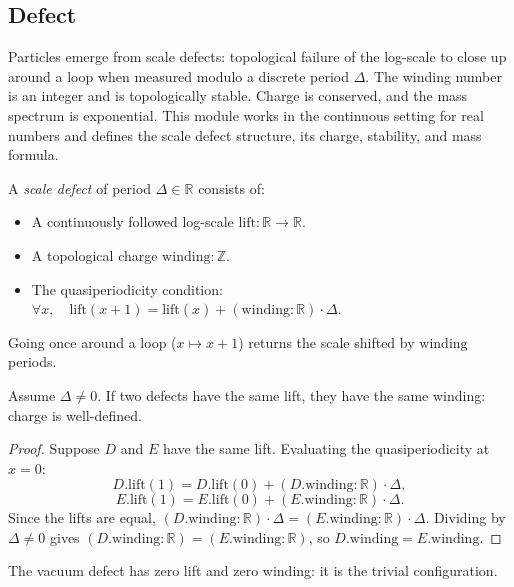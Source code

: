 \subsection{Defect}

Particles emerge from scale defects: topological failure of the log-scale to close up around a loop when measured modulo a discrete period $\Delta$. The winding number is an integer and is topologically stable. Charge is conserved, and the mass spectrum is exponential. This module works in the continuous setting for real numbers and defines the scale defect structure, its charge, stability, and mass formula.

\begin{definition}
A \emph{scale defect} of period $\Delta \in \mathbb{R}$ consists of:
\begin{itemize}
\item A continuously followed log-scale $\mathrm{lift} : \mathbb{R} \to \mathbb{R}$.
\item A topological charge $\mathrm{winding} : \mathbb{Z}$.
\item The quasiperiodicity condition: $\forall x, \quad \mathrm{lift}(x+1) = \mathrm{lift}(x) + (\mathrm{winding} : \mathbb{R}) \cdot \Delta$.
\end{itemize}
Going once around a loop ($x \mapsto x+1$) returns the scale shifted by $\mathrm{winding}$ periods.
\end{definition}

\begin{theorem}
Assume $\Delta \neq 0$. If two defects have the same lift, they have the same winding: charge is well-defined.
\end{theorem}

\begin{proof}
Suppose $D$ and $E$ have the same lift. Evaluating the quasiperiodicity at $x = 0$:
\[ D.\mathrm{lift}(1) = D.\mathrm{lift}(0) + (D.\mathrm{winding} : \mathbb{R}) \cdot \Delta, \]
\[ E.\mathrm{lift}(1) = E.\mathrm{lift}(0) + (E.\mathrm{winding} : \mathbb{R}) \cdot \Delta. \]
Since the lifts are equal, $(D.\mathrm{winding} : \mathbb{R}) \cdot \Delta = (E.\mathrm{winding} : \mathbb{R}) \cdot \Delta$. Dividing by $\Delta \neq 0$ gives $(D.\mathrm{winding} : \mathbb{R}) = (E.\mathrm{winding} : \mathbb{R})$, so $D.\mathrm{winding} = E.\mathrm{winding}$.
\end{proof}

\begin{definition}
The vacuum defect has zero lift and zero winding: it is the trivial configuration.
\end{definition}

